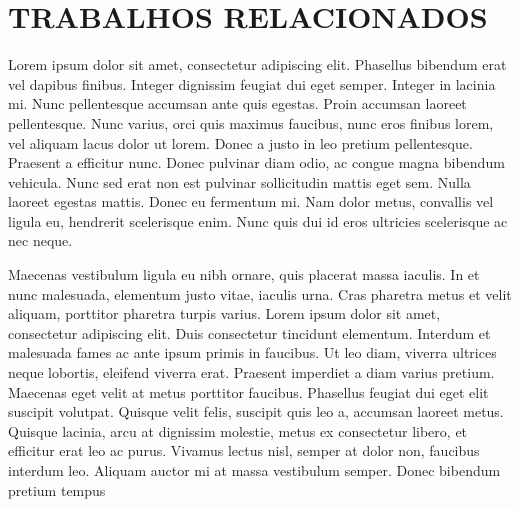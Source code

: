 \chapter{TRABALHOS RELACIONADOS}\label{ch:trabalhorelacionado}

Lorem ipsum dolor sit amet, consectetur adipiscing elit. Phasellus bibendum erat vel dapibus finibus. Integer dignissim feugiat dui eget semper. Integer in lacinia mi. Nunc pellentesque accumsan ante quis egestas. Proin accumsan laoreet pellentesque. Nunc varius, orci quis maximus faucibus, nunc eros finibus lorem, vel aliquam lacus dolor ut lorem. Donec a justo in leo pretium pellentesque. Praesent a efficitur nunc. Donec pulvinar diam odio, ac congue magna bibendum vehicula. Nunc sed erat non est pulvinar sollicitudin mattis eget sem. Nulla laoreet egestas mattis. Donec eu fermentum mi. Nam dolor metus, convallis vel ligula eu, hendrerit scelerisque enim. Nunc quis dui id eros ultricies scelerisque ac nec neque.

Maecenas vestibulum ligula eu nibh ornare, quis placerat massa iaculis. In et nunc malesuada, elementum justo vitae, iaculis urna. Cras pharetra metus et velit aliquam, porttitor pharetra turpis varius. Lorem ipsum dolor sit amet, consectetur adipiscing elit. Duis consectetur tincidunt elementum. Interdum et malesuada fames ac ante ipsum primis in faucibus. Ut leo diam, viverra ultrices neque lobortis, eleifend viverra erat. Praesent imperdiet a diam varius pretium. Maecenas eget velit at metus porttitor faucibus. Phasellus feugiat dui eget elit suscipit volutpat. Quisque velit felis, suscipit quis leo a, accumsan laoreet metus. Quisque lacinia, arcu at dignissim molestie, metus ex consectetur libero, et efficitur erat leo ac purus. Vivamus lectus nisl, semper at dolor non, faucibus interdum leo. Aliquam auctor mi at massa vestibulum semper. Donec bibendum pretium tempus